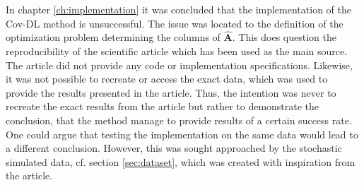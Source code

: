 In chapter \ref{ch:implementation} it was concluded that the implementation of the Cov-DL method is unsuccessful.
The issue was located to the definition of the optimization problem determining the columns of $\hat{\mathbf{A}}$. 
This does question the reproducibility of the scientific article \cite{Balkan2015} which has been used as the main source. 
The article \cite{Balkan2015} did not provide any code or implementation specifications. 
Likewise, it was not possible to recreate or access the exact data, which was used to provide the results presented in the article. 
Thus, the intention was never to recreate the exact results from the article but rather to demonstrate the conclusion, that the method manage to provide results of a certain success rate. 
One could argue that testing the implementation on the same data would lead to a different conclusion. 
However, this was sought approached by the stochastic simulated data, cf. section \ref{sec:dataset}, which was created with inspiration from the article.

